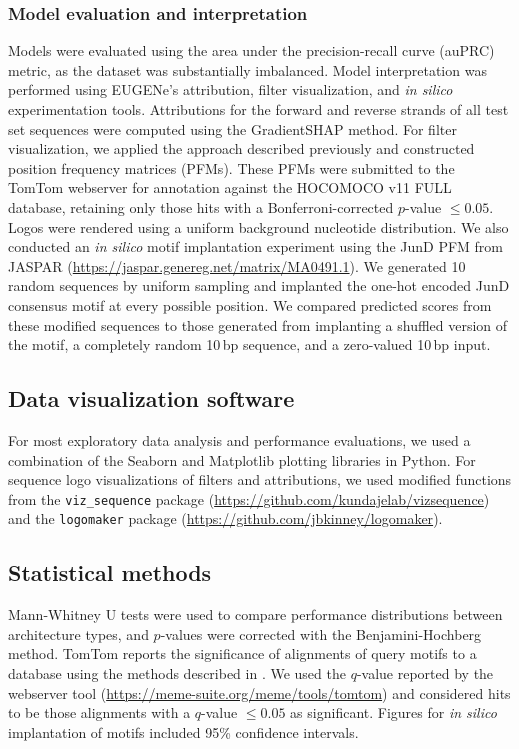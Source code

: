 \subsubsection{Model evaluation and interpretation}

Models were evaluated using the area under the precision-recall curve (auPRC) metric, as the dataset was substantially imbalanced. Model interpretation was performed using EUGENe’s attribution, filter visualization, and \textit{in silico} experimentation tools. Attributions for the forward and reverse strands of all test set sequences were computed using the GradientSHAP method.\cite{Lundberg2017-hh} For filter visualization, we applied the approach described previously and constructed position frequency matrices (PFMs). These PFMs were submitted to the TomTom webserver for annotation against the HOCOMOCO v11 FULL database,\cite{Kulakovskiy2018-oz} retaining only those hits with a Bonferroni-corrected $p$-value $\leq 0.05$. Logos were rendered using a uniform background nucleotide distribution. We also conducted an \textit{in silico} motif implantation experiment using the JunD PFM from JASPAR (\url{https://jaspar.genereg.net/matrix/MA0491.1}). We generated 10 random sequences by uniform sampling and implanted the one-hot encoded JunD consensus motif at every possible position. We compared predicted scores from these modified sequences to those generated from implanting a shuffled version of the motif, a completely random 10\,bp sequence, and a zero-valued 10\,bp input.

\subsection{Data visualization software}

For most exploratory data analysis and performance evaluations, we used a combination of the Seaborn and Matplotlib plotting libraries in Python. For sequence logo visualizations of filters and attributions, we used modified functions from the \texttt{viz\_sequence} package (\url{https://github.com/kundajelab/vizsequence}) and the \texttt{logomaker} package (\url{https://github.com/jbkinney/logomaker}).

\subsection{Statistical methods}

Mann-Whitney U tests\cite{Mann1947-dw} were used to compare performance distributions between architecture types, and $p$-values were corrected with the Benjamini-Hochberg method\cite{Benjamini1995-da}. TomTom reports the significance of alignments of query motifs to a database using the methods described in \cite{Gupta2007-zw}. We used the $q$-value reported by the webserver tool (\url{https://meme-suite.org/meme/tools/tomtom}) and considered hits to be those alignments with a $q$-value $\leq 0.05$ as significant. Figures for \textit{in silico} implantation of motifs included 95\% confidence intervals.

